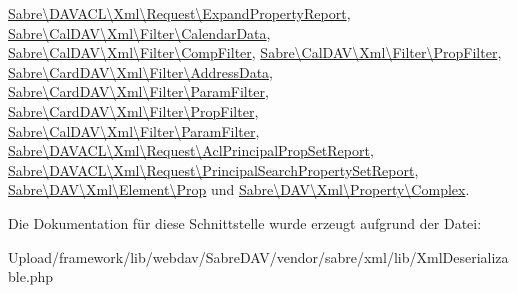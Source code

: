\mbox{\hyperlink{class_sabre_1_1_d_a_v_a_c_l_1_1_xml_1_1_request_1_1_expand_property_report_aff738789b351770eee96e261a43a8060}{Sabre\textbackslash{}\+D\+A\+V\+A\+C\+L\textbackslash{}\+Xml\textbackslash{}\+Request\textbackslash{}\+Expand\+Property\+Report}}, \mbox{\hyperlink{class_sabre_1_1_cal_d_a_v_1_1_xml_1_1_filter_1_1_calendar_data_acdcd5c6c8917760b3dd15bd10c4c7af3}{Sabre\textbackslash{}\+Cal\+D\+A\+V\textbackslash{}\+Xml\textbackslash{}\+Filter\textbackslash{}\+Calendar\+Data}}, \mbox{\hyperlink{class_sabre_1_1_cal_d_a_v_1_1_xml_1_1_filter_1_1_comp_filter_ad5f79ca22d86d30c5740d95fb90a18be}{Sabre\textbackslash{}\+Cal\+D\+A\+V\textbackslash{}\+Xml\textbackslash{}\+Filter\textbackslash{}\+Comp\+Filter}}, \mbox{\hyperlink{class_sabre_1_1_cal_d_a_v_1_1_xml_1_1_filter_1_1_prop_filter_adb11581e4195decbf52f2132dc7f2c83}{Sabre\textbackslash{}\+Cal\+D\+A\+V\textbackslash{}\+Xml\textbackslash{}\+Filter\textbackslash{}\+Prop\+Filter}}, \mbox{\hyperlink{class_sabre_1_1_card_d_a_v_1_1_xml_1_1_filter_1_1_address_data_aa2a94c5daaa13bd6710096bd24fe661e}{Sabre\textbackslash{}\+Card\+D\+A\+V\textbackslash{}\+Xml\textbackslash{}\+Filter\textbackslash{}\+Address\+Data}}, \mbox{\hyperlink{class_sabre_1_1_card_d_a_v_1_1_xml_1_1_filter_1_1_param_filter_a33d44714654e11cbb4b0340c8135a4e7}{Sabre\textbackslash{}\+Card\+D\+A\+V\textbackslash{}\+Xml\textbackslash{}\+Filter\textbackslash{}\+Param\+Filter}}, \mbox{\hyperlink{class_sabre_1_1_card_d_a_v_1_1_xml_1_1_filter_1_1_prop_filter_a9e4d746653a1a05ca702ec481e8ad049}{Sabre\textbackslash{}\+Card\+D\+A\+V\textbackslash{}\+Xml\textbackslash{}\+Filter\textbackslash{}\+Prop\+Filter}}, \mbox{\hyperlink{class_sabre_1_1_cal_d_a_v_1_1_xml_1_1_filter_1_1_param_filter_a89565cd2892a56a90868b89300d2ccc0}{Sabre\textbackslash{}\+Cal\+D\+A\+V\textbackslash{}\+Xml\textbackslash{}\+Filter\textbackslash{}\+Param\+Filter}}, \mbox{\hyperlink{class_sabre_1_1_d_a_v_a_c_l_1_1_xml_1_1_request_1_1_acl_principal_prop_set_report_a0e9ad784558bd4c3b60dfadf35c3bb8e}{Sabre\textbackslash{}\+D\+A\+V\+A\+C\+L\textbackslash{}\+Xml\textbackslash{}\+Request\textbackslash{}\+Acl\+Principal\+Prop\+Set\+Report}}, \mbox{\hyperlink{class_sabre_1_1_d_a_v_a_c_l_1_1_xml_1_1_request_1_1_principal_search_property_set_report_aac942dda2c328563364c634768d34a80}{Sabre\textbackslash{}\+D\+A\+V\+A\+C\+L\textbackslash{}\+Xml\textbackslash{}\+Request\textbackslash{}\+Principal\+Search\+Property\+Set\+Report}}, \mbox{\hyperlink{class_sabre_1_1_d_a_v_1_1_xml_1_1_element_1_1_prop_acd9e1f30391301515157fe322d4a6eb2}{Sabre\textbackslash{}\+D\+A\+V\textbackslash{}\+Xml\textbackslash{}\+Element\textbackslash{}\+Prop}} und \mbox{\hyperlink{class_sabre_1_1_d_a_v_1_1_xml_1_1_property_1_1_complex_a6c74a2adbbaaac3558dadde60a473220}{Sabre\textbackslash{}\+D\+A\+V\textbackslash{}\+Xml\textbackslash{}\+Property\textbackslash{}\+Complex}}.



Die Dokumentation für diese Schnittstelle wurde erzeugt aufgrund der Datei\+:\begin{DoxyCompactItemize}
\item 
Upload/framework/lib/webdav/\+Sabre\+D\+A\+V/vendor/sabre/xml/lib/Xml\+Deserializable.\+php\end{DoxyCompactItemize}
